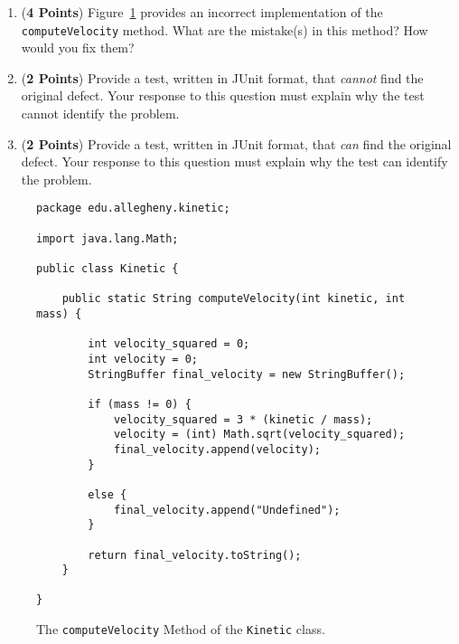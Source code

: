 \documentclass[12pt,epsf,psfig,graphics]{article}
\begin{document}
\begin{enumerate}
\begin{enumerate}
\item ({\bf 4 Points}) Figure~\ref{kinetic} provides an incorrect implementation of the {\tt computeVelocity} method.
	What are the mistake(s) in this method?  How would you fix them?

\item ({\bf 2 Points}) Provide a test, written in JUnit format, that {\em cannot} find the original defect.  Your
	response to this question must explain why the test cannot identify the problem.

\item ({\bf 2 Points}) Provide a test, written in JUnit format, that {\em can} find the original defect.  Your
	response to this question must explain why the test can identify the problem.



\end{enumerate}

\begin{figure}[t]
\begin{minipage}{6in}
  \lstset{numbers=left}
  \begin{lstlisting}
package edu.allegheny.kinetic;

import java.lang.Math;

public class Kinetic {

	public static String computeVelocity(int kinetic, int mass) {

		int velocity_squared = 0;
		int velocity = 0;
		StringBuffer final_velocity = new StringBuffer();

		if (mass != 0) {
			velocity_squared = 3 * (kinetic / mass);
			velocity = (int) Math.sqrt(velocity_squared);
			final_velocity.append(velocity);
		}

		else {
			final_velocity.append("Undefined");
		}

		return final_velocity.toString();
	}

}
  \end{lstlisting}

\end{minipage}
\caption{The {\tt computeVelocity} Method of the {\tt Kinetic} class.}
\label{kinetic}
\end{figure}


\end{enumerate}
\end{document}
